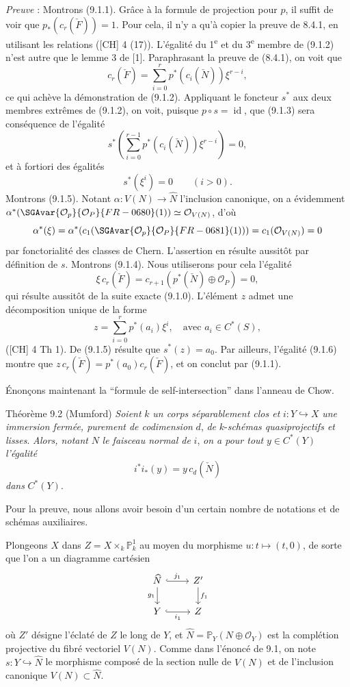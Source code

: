 \emph{Preuve} : Montrons (9.1.1). Grâce à la formule de projection pour $p$, il suffit de voir que $p_*(c_r(\check F))=1$. Pour cela, il n'y a qu'à copier la preuve de 8.4.1, en utilisant les relations ([CH] 4 (17)). L'égalité du 1\textsuperscript{e} et du 3\textsuperscript{e} membre de (9.1.2) n'est autre que le lemme 3 de [1]. Paraphrasant la preuve de (8.4.1), on voit que
\[
c_r(\check F)=\sum_{i=0}^r p^*(c_i(\check N))\xi^{r-i},
\tag*{(9.1.2) bis}
\]
ce qui achève la démonstration de (9.1.2). Appliquant le foncteur $s^*$ aux deux membres extrêmes de (9.1.2), on voit, puisque $p\circ s=\operatorname{id}$, que (9.1.3) sera conséquence de l'égalité
\[
s^*\left(\sum_{i=0}^{r-1}p^*(c_i(\check N))\xi^{r-i}\right)=0,
\]
et à fortiori des égalités
\[
s^*(\xi^i)=0\qquad(i>0).
\tag{9.1.5}
\]
Montrons (9.1.5). Notant $\alpha:V(N)\to\widehat N$ l'inclusion canonique, on a évidemment $\alpha^*(\SGAvar{\mathcal{O}_p}{\mathcal{O}_P}{FR-0680}(1))\simeq\mathcal{O}_{V(N)}$, d'où
\[
\alpha^*(\xi)=\alpha^*(c_1(\SGAvar{\mathcal{O}_p}{\mathcal{O}_P}{FR-0681}(1)))=c_1(\mathcal{O}_{V(N)})=0
\]
par fonctorialité des classes de Chern. L'assertion en résulte aussitôt par définition de $s$. Montrons (9.1.4). Nous utiliserons pour cela l'égalité
\[
\xi\,c_r(\check F)=c_{r+1}(p^*(\check N)\oplus\mathcal{O}_P)=0,
\tag{9.1.6}
\]
qui résulte aussitôt de la suite exacte (9.1.0). L'élément $z$ admet une décomposition unique de la forme
\[
z=\sum_{i=0}^r p^*(a_i)\xi^i,\quad\text{avec }a_i\in C^*(S),
\]
([CH] 4 Th 1). De (9.1.5) résulte que $s^*(z)=a_0$. Par ailleurs, l'égalité (9.1.6) montre que $z\,c_r(\check F)=p^*(a_0)c_r(\check F)$, et on conclut par (9.1.1).

Énonçons maintenant la ``formule de self-intersection'' dans l'anneau de Chow.

\begin{statement}{Théorème 9.2 (Mumford)}
\emph{Soient} $k$ \emph{un corps séparablement clos et} $i:Y\hookrightarrow X$ \emph{une immersion fermée, purement de codimension} $d$, \emph{de} $k$-\emph{schémas quasiprojectifs et lisses}. \emph{Alors, notant} $N$ \emph{le faisceau normal de} $i$, \emph{on a pour tout} $y\in C^*(Y)$ \emph{l'égalité}
\[
i^*i_*(y)=y\,c_d(\check N)
\]
\emph{dans} $C^*(Y)$.
\end{statement}

Pour la preuve, nous allons avoir besoin d'un certain nombre de notations et de schémas auxiliaires.

Plongeons $X$ dans $Z=X\times_k\mathbb{P}^1_k$ au moyen du morphisme $u:t\mapsto(t,0)$, de sorte que l'on a un diagramme cartésien
\[
\begin{tikzcd}
\widehat N \arrow[r,hook,"j_1"] \arrow[d,"g_1"'] & Z' \arrow[d,"f_1"]\\
Y \arrow[r,hook,"i_1"'] & Z
\end{tikzcd}
\]
où $Z'$ désigne l'éclaté de $Z$ le long de $Y$, et $\widehat N=\mathbb{P}_Y(N\oplus\mathcal{O}_Y)$ est la complétion projective du fibré vectoriel $V(N)$. Comme dans l'énoncé de 9.1, on note $s:Y\hookrightarrow\widehat N$ le morphisme composé de la section nulle de $V(N)$ et de l'inclusion canonique $V(N)\subset\widehat N$.

